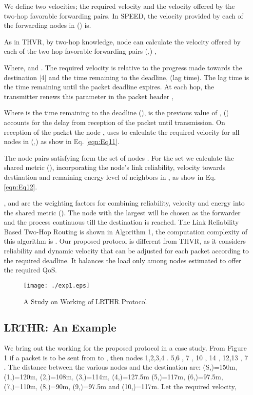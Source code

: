 \documentclass[fleqn,twoside]{article}
\begin{document}
We define two velocities; the required velocity  and the velocity offered by the two-hop favorable forwarding pairs. In SPEED, 
the velocity provided by each of the forwarding nodes in () is.

As in THVR, by two-hop knowledge, node  can calculate the velocity offered by each of the two-hop favorable forwarding pairs (,) ,

Where,  and . The required velocity is relative to the progress made towards the destination
[4] and the time remaining to the deadline,  (lag time). The lag time is the time remaining until the packet deadline expires. At each hop, the transmitter renews this
parameter in the packet header ,

Where  is the time remaining to the deadline (),  is the previous value 
of , () accounts for the delay 
from reception of the packet until transmission. On reception of the packet the node , uses  to calculate the 
required velocity  for all nodes in (,) as show in Eq. \ref{eqn:Eq11}.

The node pairs satisfying  form the set of nodes . For the set  we calculate 
the shared metric (), incorporating the node's link reliability, velocity towards destination and 
remaining energy level of neighbors in  , as show in Eq. \ref{eqn:Eq12}.

,  and  are the weighting factors for combining reliability, velocity and energy into the shared metric (). The node  with the 
largest  will be chosen as the forwarder and the process continuous till the destination is reached. The
Link Reliability Based Two-Hop Routing is shown in Algorithm 1, the computation complexity of this algorithm is . Our proposed protocol is different from THVR, as it considers
reliability and dynamic velocity that can be adjusted for each packet according to the required deadline. It balances the load only among nodes estimated to offer the required QoS.


\begin{figure}
\texttt{[image: ./exp1.eps]}
\begin{center}
\begin{small}
\caption{A Study on Working of LRTHR Protocol}
\end{small}
\end{center}
\end{figure}


\subsection{LRTHR: An Example}
We bring out the working for the proposed protocol in a case study. From Figure 1 if a packet is to be sent from  to , then 
nodes {1,2,3,4}  . {5,6}  , 
{7}  , {10}  , {14}  , {12,13}  , {7}  . 
The distance between the various nodes and the destination are: (S,)=150m, (1,)=120m, (2,)=108m, (3,)=114m, (4,)=127.5m
(5,)=117m, (6,)=97.5m, (7,)=110m, (8,)=90m, (9,)=97.5m and (10,)=117m. Let the required velocity, 
\end{document}
